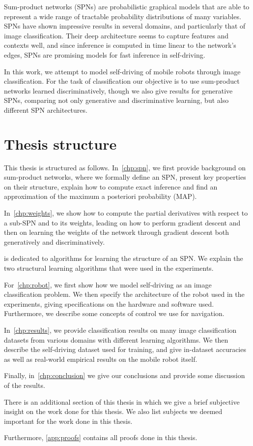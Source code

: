 Sum-product networks (SPNs) are probabilistic graphical models that are able to represent a wide
range of tractable probability distributions of many variables. SPNs have shown impressive results
in several domains, and particularly that of image classification. Their deep architecture seems to
capture features and contexts well, and since inference is computed in time linear to the network's
edges, SPNs are promising models for fast inference in self-driving.

In this work, we attempt to model self-driving of mobile robots through image classification. For
the task of classification our objective is to use sum-product networks learned discriminatively,
though we also give results for generative SPNs, comparing not only generative and discriminative
learning, but also different SPN architectures.

\section{Thesis structure}

This thesis is structured as follows. In~\autoref{chp:spn}, we first provide background on
sum-product networks, where we formally define an SPN, present key properties on their structure,
explain how to compute exact inference and find an approximation of the maximum a posteriori
probability (MAP).

In~\autoref{chp:weights}, we show how to compute the partial derivatives with respect to a sub-SPN
and to its weights, leading on how to perform gradient descent and then on learning the weights of
the network through gradient descent both generatively and discriminatively.

 is dedicated to algorithms for learning the structure of an SPN\@. We explain
the two structural learning algorithms that were used in the experiments.

For~\autoref{chp:robot}, we first show how we model self-driving as an image classification
problem. We then specify the architecture of the robot used in the experiments, giving
specifications on the hardware and software used. Furthermore, we describe some concepts of control
we use for navigation.

In~\autoref{chp:results}, we provide classification results on many image classification datasets
from various domains with different learning algorithms. We then describe the self-driving dataset
used for training, and give in-dataset accuracies as well as real-world empirical results on the
mobile robot itself.

Finally, in~\autoref{chp:conclusion} we give our conclusions and provide some discussion of the
results.

There is an additional section of this thesis in which we give a brief subjective insight on the
work done for this thesis. We also list subjects we deemed important for the work done in this
thesis.

Furthermore, \autoref{app:proofs} contains all proofs done in this thesis.

